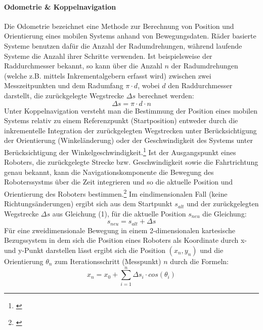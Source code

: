\paragraph{Odometrie \& Koppelnavigation}\label{odometrie}
Die Odometrie bezeichnet eine Methode zur Berechnung von Position und Orientierung eines mobilen Systems anhand von Bewegungsdaten. Räder basierte Systeme benutzen dafür die Anzahl der Radumdrehungen, während laufende Systeme die Anzahl ihrer Schritte verwenden. Ist beispielsweise der Raddurchmesser bekannt, so kann über die Anzahl $n$ der Radumdrehungen (welche z.B. mittels Inkrementalgebern erfasst wird) zwischen zwei Messzeitpunkten und dem Radumfang $\pi \cdot d$, wobei $d$ den Raddurchmesser darstellt, die zurückgelegte Wegstrecke $\Delta{}s$ berechnet werden:
\begin{equation}
\Delta{}s = \pi \cdot d \cdot n
\end{equation}
Unter Koppelnavigation versteht man die Bestimmung der Position eines mobilen Systems relativ zu einem Referenzpunkt (Startposition) entweder durch die inkrementelle Integration der zurückgelegten Wegstrecken unter Berücksichtigung der Orientierung (Winkeländerung) oder der Geschwindigkeit des Systems unter Berücksichtigung der Winkelgeschwindigkeit.\footnote{\citep[vgl.][Mobile Robotik, Seite 98]{Nehmzow.MobileRobotik}\label{note16}}
\newline
Ist der Ausgangspunkt eines Roboters, die zurückgelegte Strecke bzw. Geschwindigkeit sowie die Fahrtrichtung genau bekannt, kann die Navigationskomponente die Bewegung des Roboterssystms über die Zeit integrieren und so die aktuelle Position und Orientierung des Roboters bestimmen.\footnote{\citep[vgl.][Handbuch Robotik, Seite 107 f.]{Haun.HandbuchRobotik}\label{note17}}
\newline
Im eindimensionalen Fall (keine Richtungsänderungen) ergibt sich aus dem Startpunkt $s_{alt}$ und  der zurückgelegten Wegstrecke $\Delta{}s$ aus Gleichung (1), für die aktuelle Position $s_{neu}$ die Gleichung:
\begin{equation}
s_{neu} = s_{alt} + \Delta{}s
\end{equation}
Für eine zweidimensionale Bewegung in einem 2-dimensionalen kartesische Bezugssystem in dem sich die Position eines Roboters als Koordinate durch x- und y-Punkt darstellen lässt ergibt sich die
Position $(x_{n},y_{n})$ und die Orientierung $\theta{}_{n}$ zum Iterationsschritt (Messpunkt) $n$ durch die Formeln:
\begin{equation}
x_{n} = x_{0} + \sum_{i=1}^{n} \Delta{}s_{i} \cdot cos(\theta{}_{i})
\end{equation}
